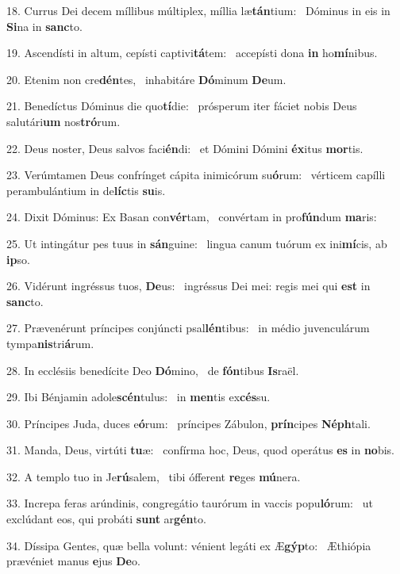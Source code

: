 18. Currus Dei decem míllibus múltiplex, míllia læ\textbf{tán}tium: \ast\  Dóminus in eis in \textbf{Si}na in \textbf{sanc}to.\

19. Ascendísti in altum, cepísti captivi\textbf{tá}tem: \ast\  accepísti dona \textbf{in} ho\textbf{mí}nibus.\

20. Etenim non cre\textbf{dén}tes, \ast\  inhabitáre \textbf{Dó}minum \textbf{De}um.\

21. Benedíctus Dóminus die quo\textbf{tí}die: \ast\  prósperum iter fáciet nobis Deus salutári\textbf{um} nos\textbf{tró}rum.\

22. Deus noster, Deus salvos faci\textbf{én}di: \ast\  et Dómini Dómini \textbf{éx}itus \textbf{mor}tis.\

23. Verúmtamen Deus confrínget cápita inimicórum su\textbf{ó}rum: \ast\  vérticem capílli perambulántium in de\textbf{líc}tis \textbf{su}is.\

24. Dixit Dóminus: Ex Basan con\textbf{vér}tam, \ast\  convértam in pro\textbf{fún}dum \textbf{ma}ris:\

25. Ut intingátur pes tuus in \textbf{sán}guine: \ast\  lingua canum tuórum ex ini\textbf{mí}cis, ab \textbf{ip}so.\

26. Vidérunt ingréssus tuos, \textbf{De}us: \ast\  ingréssus Dei mei: regis mei qui \textbf{est} in \textbf{sanc}to.\

27. Prævenérunt príncipes conjúncti psal\textbf{lén}tibus: \ast\  in médio juvenculárum tympa\textbf{nis}tri\textbf{á}rum.\

28. In ecclésiis benedícite Deo \textbf{Dó}mino, \ast\  de \textbf{fón}tibus \textbf{Is}raël.\

29. Ibi Bénjamin adole\textbf{scén}tulus: \ast\  in \textbf{men}tis ex\textbf{cés}su.\

30. Príncipes Juda, duces e\textbf{ó}rum: \ast\  príncipes Zábulon, \textbf{prín}cipes \textbf{Néph}tali.\

31. Manda, Deus, virtúti \textbf{tu}æ: \ast\  confírma hoc, Deus, quod operátus \textbf{es} in \textbf{no}bis.\

32. A templo tuo in Je\textbf{rú}salem, \ast\  tibi ófferent \textbf{re}ges \textbf{mú}nera.\

33. Increpa feras arúndinis, congregátio taurórum in vaccis popu\textbf{ló}rum: \ast\  ut exclúdant eos, qui probáti \textbf{sunt} ar\textbf{gén}to.\

34. Díssipa Gentes, quæ bella volunt: vénient legáti ex Æ\textbf{gýp}to: \ast\  Æthiópia prævéniet manus \textbf{e}jus \textbf{De}o.\


